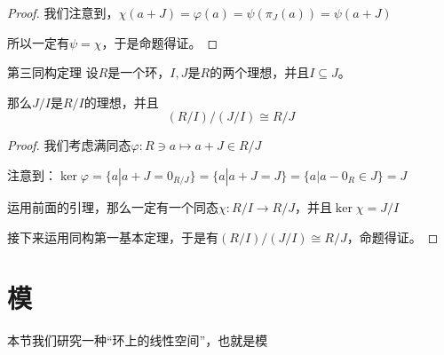\documentclass[12pt, a4paper, oneside, UTF8]{ctexbook}
\begin{document}
\begin{para}{0}
\begin{proof}
					我们注意到，$\chi(a+J)=\varphi (a)=\psi \left(\pi_{J}(a)\right)=\psi(a+J)$
					
					所以一定有$\psi =\chi $，于是命题得证。
				\end{proof}
				\begin{them}{第三同构定理}{}
					设$R$是一个环，$I,J$是$R$的两个理想，并且$I \subseteq J$。

					那么$J/I$是$R/I$的理想，并且
					\begin{equation}
						(R/I)/(J/I) \cong R/J
					\end{equation}
				\end{them}
				\begin{proof}
					我们考虑满同态$\varphi : R \ni a \mapsto a+J \in R/J$

					注意到：$\ker \varphi =\{a|a+J=0_{R/J}\}=\{a|a+J=J\}=\{a|a-0_R \in J\}=J$

					运用前面的引理，那么一定有一个同态$\chi : R/I \rightarrow R/J$，并且$\ker \chi =J/I$

					接下来运用同构第一基本定理，于是有$(R/I)/(J/I) \cong R/J$，命题得证。
				\end{proof}
		\end{para}
	\section{模}
		本节我们研究一种“环上的线性空间”，也就是模
\end{document}
